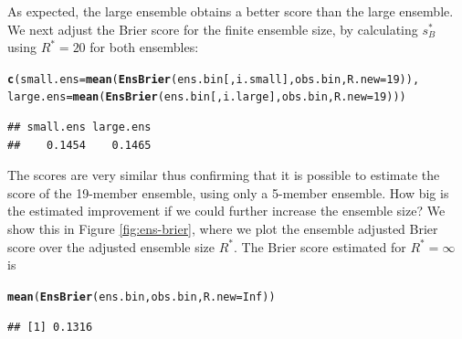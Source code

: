 \documentclass[article]{jss}\usepackage{graphicx, color}
\makeatletter
\newcommand{\hlfunctioncall}[1]{\textcolor[rgb]{0,0.501960784313725,0.752941176470588}{\textbf{#1}}}%
\newenvironment{kframe}{%
 \def\at@end@of@kframe{}%
 \ifinner\ifhmode%
  \def\at@end@of@kframe{\end{minipage}}%
  \begin{minipage}{\columnwidth}%
 \fi\fi%
 \def\FrameCommand##1{\hskip\@totalleftmargin \hskip-\fboxsep
 \colorbox{shadecolor}{##1}\hskip-\fboxsep
     \hskip-\linewidth \hskip-\@totalleftmargin \hskip\columnwidth}%
 \MakeFramed {\advance\hsize-\width
   \@totalleftmargin\z@ \linewidth\hsize
   \@setminipage}}%
 {\par\unskip\endMakeFramed%
 \at@end@of@kframe}
\newenvironment{knitrout}{}{} %
\makeatother
\begin{document}
As expected, the large ensemble obtains a better score than the large ensemble.
We next adjust the Brier score for the finite ensemble size, by calculating $s_{B}^*$ using $R^*=20$ for both ensembles:

\begin{knitrout}
\color{fgcolor}\begin{kframe}
\begin{alltt}
\hlfunctioncall{c}(small.ens=\hlfunctioncall{mean}(\hlfunctioncall{EnsBrier}(ens.bin[, i.small], obs.bin, R.new=19)), 
  large.ens=\hlfunctioncall{mean}(\hlfunctioncall{EnsBrier}(ens.bin[, i.large], obs.bin, R.new=19)))
\end{alltt}
\begin{verbatim}
## small.ens large.ens 
##    0.1454    0.1465
\end{verbatim}
\end{kframe}
\end{knitrout}


The scores are very similar thus confirming that it is possible to estimate the score of the 19-member ensemble, using only a 5-member ensemble.
How big is the estimated improvement if we could further increase the ensemble size?
We show this in Figure \ref{fig:ens-brier}, where we plot the ensemble adjusted Brier score over the adjusted ensemble size $R^*$.
The Brier score estimated for $R^*=\infty$ is

\begin{knitrout}
\color{fgcolor}\begin{kframe}
\begin{alltt}
\hlfunctioncall{mean}(\hlfunctioncall{EnsBrier}(ens.bin, obs.bin, R.new=Inf))
\end{alltt}
\begin{verbatim}
## [1] 0.1316
\end{verbatim}
\end{kframe}
\end{knitrout}
\end{document}
